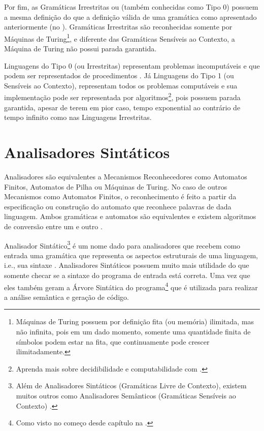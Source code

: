 {    Por fim,
    as Gramáticas Irrestritas ou (também conhecidas como Tipo 0) possuem a mesma definição do
    que a definição válida de uma gramática como apresentado anteriormente (no
    ).
    Gramáticas Irrestritas são reconhecidas somente por Máquinas de Turing\footnote{
    Máquinas de Turing possuem por definição fita (ou memória) ilimitada,
    mas não infinita,
    pois em um dado momento,
    somente uma quantidade finita de símbolos podem estar na fita,
    que continuamente pode crescer ilimitadamente.
    },
    e diferente das Gramáticas Sensíveis ao Contexto,
    a Máquina de Turing não possui parada garantida.

    Linguagens do Tipo 0 (ou Irrestritas) representam problemas incomputáveis e
    que podem ser representados de procedimentos \cite{sipserBook}.
    Já Linguagens do Tipo 1 (ou Sensíveis ao Contexto),
    representam todos os problemas computáveis e
    sua implementação pode ser representada por algoritmos\footnote{
    Aprenda mais sobre decidibilidade e
    computabilidade com .
    },
    pois possuem parada garantida,
    apesar de terem em pior caso,
    tempo exponential ao contrário de tempo infinito como nas Linguagens Irrestritas.


\section{Analisadores Sintáticos}
\label{analisadoresSintaticos}

    Analisadores são equivalentes a Mecanismos Reconhecedores como Automatos Finitos,
    Automatos de Pilha ou
    Máquinas de Turing.
    No caso de outros Mecanismos como Automatos Finitos,
    o reconhecimento é feito a partir da especificação ou
    construção do automato que reconhece palavras de dada linguagem.
    Ambos gramáticas e
    automatos são equivalentes e
    existem algoritmos de conversão entre um e
    outro \cite{hopcroftBook}.

    Analisador Sintático\footnote{
    Além de Analisadores Sintáticos (Gramáticas Livre de Contexto),
    existem muitos outros como Analisadores Semânticos (Gramáticas Sensíveis ao Contexto) \cite{contextSensitiveParsing}.
    }
    é um nome dado para analisadores que recebem como entrada uma gramática que representa os aspectos estruturais de uma linguagem,
    i.e.,
    sua sintaxe \cite{ahoCompilerDragonBook}.
    Analisadores Sintáticos possuem muito mais utilidade do que somente checar se a sintaxe do programa de entrada está correta.
    Uma vez que eles também geram a Árvore Sintática do programa\footnote{
    Como visto no começo desde capítulo na .
    }
    que é utilizada para realizar a análise semântica e
    geração de código.


}
